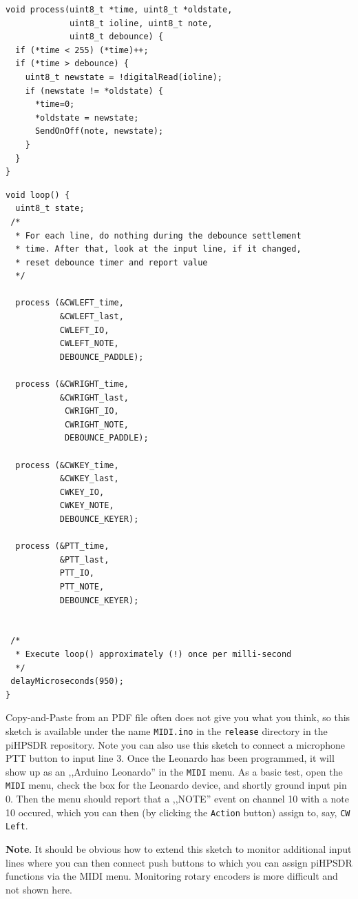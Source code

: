\documentclass[12pt]{book}
\def\rett#1{\texttt{\color{red}#1}}
\def\bltt#1{\texttt{\color{blue}#1}}
\begin{document}
\begin{small}
\begin{verbatim}
void process(uint8_t *time, uint8_t *oldstate,
             uint8_t ioline, uint8_t note,
             uint8_t debounce) {
  if (*time < 255) (*time)++;
  if (*time > debounce) {
    uint8_t newstate = !digitalRead(ioline);
    if (newstate != *oldstate) {  
      *time=0;
      *oldstate = newstate;
      SendOnOff(note, newstate);
    }
  }
}
\end{verbatim}
\clearpage
\begin{verbatim}
void loop() {
  uint8_t state;
 /*
  * For each line, do nothing during the debounce settlement
  * time. After that, look at the input line, if it changed,
  * reset debounce timer and report value
  */

  process (&CWLEFT_time,
           &CWLEFT_last,
           CWLEFT_IO,
           CWLEFT_NOTE,
           DEBOUNCE_PADDLE);
           
  process (&CWRIGHT_time,
           &CWRIGHT_last,
            CWRIGHT_IO,
            CWRIGHT_NOTE,
            DEBOUNCE_PADDLE);
            
  process (&CWKEY_time,
           &CWKEY_last,
           CWKEY_IO,
           CWKEY_NOTE,
           DEBOUNCE_KEYER);
  
  process (&PTT_time,
           &PTT_last,
           PTT_IO,
           PTT_NOTE,
           DEBOUNCE_KEYER);


 /*
  * Execute loop() approximately (!) once per milli-second
  */
 delayMicroseconds(950);
}
\end{verbatim}
\end{small}
\clearpage
Copy-and-Paste from an PDF file often does not give you what you think, so
this sketch is available under the name \texttt{MIDI.ino} in the \texttt{release}
directory in the piHPSDR repository. Note you can
also use this sketch to connect a microphone PTT button to input line 3. Once the
Leonardo has been programmed,
it will show up as an ,,Arduino Leonardo'' in the \bltt{MIDI} menu. As a basic test,
open the \bltt{MIDI} menu, check the box for the Leonardo device,
 and shortly ground input pin 0. Then the menu should report
that a ,,NOTE'' event on channel 10 with a note 10 occured, which you can then
(by clicking the \rett{Action} button) assign to, say, \bltt{CW Left}.

\textbf{Note}. It should be obvious how to extend this sketch to monitor additional
input lines where you can then connect push buttons to which you can assign piHPSDR
functions via the MIDI menu. Monitoring rotary encoders is more difficult and not
shown here.
\end{document}
